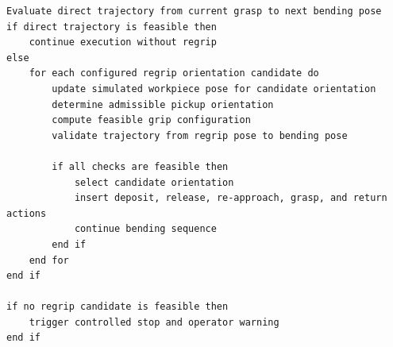 \begin{lstlisting}[caption={Pseudocode for regrip decision and insertion logic.}, label={lst:regrip-decision}]
Evaluate direct trajectory from current grasp to next bending pose
if direct trajectory is feasible then
    continue execution without regrip
else
    for each configured regrip orientation candidate do
        update simulated workpiece pose for candidate orientation
        determine admissible pickup orientation
        compute feasible grip configuration
        validate trajectory from regrip pose to bending pose

        if all checks are feasible then
            select candidate orientation
            insert deposit, release, re-approach, grasp, and return actions
            continue bending sequence
        end if
    end for
end if

if no regrip candidate is feasible then
    trigger controlled stop and operator warning
end if
\end{lstlisting}
